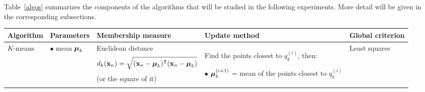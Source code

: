 \documentclass[a4paper]{article}
\newcommand{\trn}{^{\mathsf T}} %
\newcommand{\xv}{\ensuremath\mathbf{x}}  %
\newcommand{\muv}{\ensuremath\boldsymbol{\mu}}  %
\newcommand{\Sm}{\ensuremath\boldsymbol{\Sigma}}  %
\begin{document}
\begin{latexonly}
Table~\ref{algos} summarizes the components of the algorithms that
will be studied in the following experiments. More detail will be
given in the corresponding subsections.

\newcommand{\PBS}[1]{\let\temp=\\#1\let\\=\temp}
\newcommand{\RR}{\PBS\raggedright\hspace{0pt}}
\newcommand{\RL}{\PBS\raggedleft\hspace{0pt}}
\newcommand{\CC}{\PBS\centering\hspace{0pt}}

\begin{table}
  \setlength{\tabcolsep}{0.05in}
  \renewcommand{\arraystretch}{2.2}
  \begin{tabular}{|>{\RR}m{5.2em}|>{\RR}m{7.3em}|>{\CC}m{21em}|>{\RR}m{22.5em}|>{\CC}m{8em}|}
    \hline
    \centering\bf Algorithm &
    \centering\bf Parameters &
    \bf Membership measure &
    \centering\bf Update method &
    \bf Global criterion \\ \hline
    $K$-means    &
    $\bullet$ mean $\muv_k$ &
    Euclidean distance \linebreak
    \[d_k(\xv_n)= \sqrt{(\xv_n-\muv_k)\trn(\xv_n-\muv_k)}\] \linebreak
    (or the square of it)
    &
    Find the points closest to $q_k^{(i)}$, then:

    \medskip
    $\bullet$ $\muv_{k}^{(i+1)}$ = mean of the points closest to $q_k^{(i)}$ &
    Least squares \\ 
    \hline



\end{tabular}
\end{table}
\end{latexonly}
\end{document}
